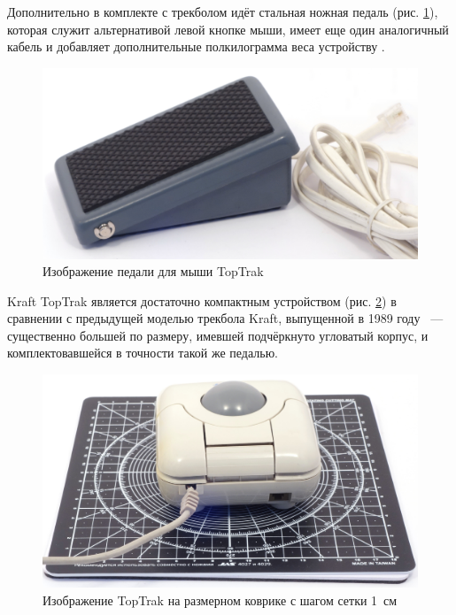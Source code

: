 \documentclass[11pt, a4paper]{article}
\begin{document}
Дополнительно в комплекте с трекболом идёт стальная ножная педаль (рис. \ref{fig:TopTrakPedal}), которая служит альтернативой левой кнопке мыши, имеет еще один аналогичный кабель и добавляет дополнительные полкилограмма веса устройству \cite{mouses}.

\begin{figure}[h]
    \centering
    \includegraphics[scale=0.45]{1990_kraft_toptrack/pedal_30.jpg}
    \caption{Изображение педали для мыши TopTrak}
    \label{fig:TopTrakPedal}
\end{figure}


Kraft TopTrak является достаточно компактным устройством (рис. \ref{fig:TopTrakSize}) в сравнении с предыдущей моделью трекбола Kraft, выпущенной в 1989 году ~--- существенно большей по размеру, имевшей подчёркнуто угловатый корпус, и комплектовавшейся в точности такой же педалью.

\begin{figure}[h]
    \centering
    \includegraphics[scale=0.35]{1990_kraft_toptrack/2.6_30.jpg}
    \caption{Изображение TopTrak на размерном коврике с шагом сетки 1~см}
    \label{fig:TopTrakSize}
\end{figure}
\end{document}
